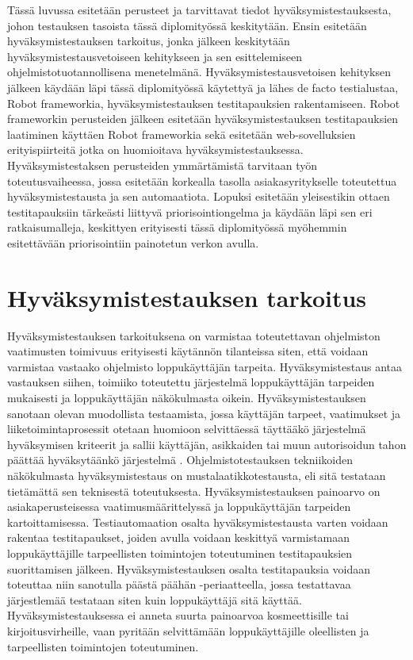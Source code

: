 Tässä luvussa esitetään perusteet ja tarvittavat tiedot hyväksymistestauksesta, johon testauksen tasoista tässä diplomityössä keskitytään.
Ensin esitetään hyväksymistestauksen tarkoitus, jonka jälkeen keskitytään hyväksymistestausvetoiseen kehitykseen ja sen esittelemiseen ohjelmistotuotannollisena menetelmänä.
Hyväksymistestausvetoisen kehityksen jälkeen käydään läpi tässä diplomityössä käytettyä ja lähes de facto testialustaa, Robot frameworkia, hyväksymistestauksen testitapauksien rakentamiseen.
Robot frameworkin perusteiden jälkeen esitetään hyväksymistestauksen testitapauksien laatiminen käyttäen Robot frameworkia sekä esitetään web-sovelluksien erityispiirteitä jotka on huomioitava hyväksymistestauksessa.
Hyväksymistestaksen perusteiden ymmärtämistä tarvitaan työn toteutusvaiheessa, jossa esitetään korkealla tasolla asiakasyritykselle toteutettua hyväksymistestausta ja sen automaatiota.
Lopuksi esitetään yleisestikin ottaen testitapauksiin tärkeästi liittyvä priorisointiongelma ja käydään läpi sen eri ratkaisumalleja, keskittyen erityisesti tässä diplomityössä myöhemmin esitettävään priorisointiin painotetun verkon avulla.

\section{Hyväksymistestauksen tarkoitus} \label{ch:08_hyvaksymistestauksen_tarkoitus}

  Hyväksymistestauksen tarkoituksena on varmistaa toteutettavan ohjelmiston vaatimusten toimivuus erityisesti käytännön tilanteissa siten, että voidaan varmistaa vastaako ohjelmisto loppukäyttäjän tarpeita.
  Hyväksymistestaus antaa vastauksen siihen, toimiiko toteutettu järjestelmä loppukäyttäjän tarpeiden mukaisesti ja loppukäyttäjän näkökulmasta oikein.
  Hyväksymistestauksen sanotaan olevan muodollista testaamista, jossa käyttäjän tarpeet, vaatimukset ja liiketoimintaprosessit otetaan huomioon selvittäessä täyttääkö järjestelmä hyväksymisen kriteerit ja sallii käyttäjän, asikkaiden tai muun autorisoidun tahon päättää hyväksytäänkö järjestelmä \parencite{istqb_glossary_nodate}.
  Ohjelmistotestauksen tekniikoiden näkökulmasta hyväksymistestaus on mustalaatikkotestausta, eli sitä testataan tietämättä sen teknisestä toteutuksesta.
  Hyväksymistestauksen painoarvo on asiakaperusteisessa vaatimusmäärittelyssä ja loppukäyttäjän tarpeiden kartoittamisessa.
  Testiautomaation osalta hyväksymistestausta varten voidaan rakentaa testitapaukset, joiden avulla voidaan keskittyä varmistamaan loppukäyttäjille tarpeellisten toimintojen toteutuminen testitapauksien suorittamisen jälkeen.
  Hyväksymistestauksen osalta testitapauksia voidaan toteuttaa niin sanotulla päästä päähän -periaatteella, jossa testattavaa järjestlemää testataan siten kuin loppukäyttäjä sitä käyttää.
  Hyväksymistestauksessa ei anneta suurta painoarvoa kosmeettisille tai kirjoitusvirheille, vaan pyritään selvittämään loppukäyttäjille oleellisten ja tarpeellisten toimintojen toteutuminen.

